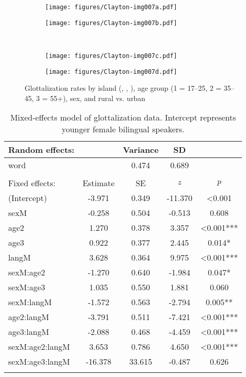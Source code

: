 \documentclass[output=paper,colorlinks,citecolor=brown]{langscibook}
\begin{document}
\begin{figure}
\begin{subfigure}{.5\textwidth}\centering
\texttt{[image: figures/Clayton-img007a.pdf]}
\caption{}
\end{subfigure}%
\begin{subfigure}{.5\textwidth}\centering
\texttt{[image: figures/Clayton-img007b.pdf]}
\caption{}
\end{subfigure}\medskip\\
\begin{subfigure}{.5\textwidth}\centering
\texttt{[image: figures/Clayton-img007c.pdf]}
\caption{}
\end{subfigure}%
\begin{subfigure}{.5\textwidth}\centering
\texttt{[image: figures/Clayton-img007d.pdf]}
\caption{}
\end{subfigure}
\caption{Glottalization rates by island (, , ), age group (1 = 17--25, 2 = 35--45, 3 = 55+), sex, and rural vs. urban}
\label{fig:7}
\end{figure}

\begin{table}
\begin{tabular}{l S[table-format=-2.3] S[table-format=2.3] S[table-format=-2.3] S[table-format=<1.3{***}]}
\lsptoprule
{Random effects:} &  & {Variance} & {SD} & \\\midrule
{word} &  & {0.474} & {0.689} & \\
\\
{Fixed effects:} & {Estimate} & {SE} & {$z$} & {$p$}\\
\midrule
(Intercept) & -3.971 & 0.349 & -11.370 & <0.001\\
sexM & -0.258 & 0.504 & -0.513 & 0.608\\
age2 & 1.270 & 0.378 & 3.357 & <0.001{***} \\
age3 & 0.922 & 0.377 & 2.445 & 0.014{*} \\
langM & 3.628 & 0.364 & 9.975 & <0.001{***} \\
sexM:age2 & -1.270 & 0.640 & -1.984 & 0.047{*} \\
sexM:age3 & 1.035 & 0.550 & 1.881 & 0.060 \\
sexM:langM & -1.572 & 0.563 & -2.794 & 0.005{**} \\
age2:langM & -3.791 & 0.511 & -7.421 & <0.001{***} \\
age3:langM & -2.088 & 0.468 & -4.459 & <0.001{***} \\
sexM:age2:langM & 3.653 & 0.786 & 4.650 & <0.001{***} \\
sexM:age3:langM & -16.378 & 33.615 & -0.487 & 0.626\\
\lspbottomrule
\end{tabular}
\caption{Mixed-effects model of glottalization data. Intercept represents younger female bilingual speakers.}
\label{tab:clayton:7}
\end{table}
\end{document}
